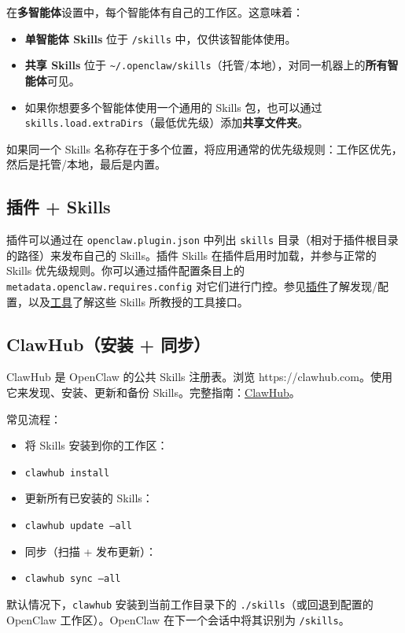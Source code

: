 在\textbf{多智能体}设置中，每个智能体有自己的工作区。这意味着：

\begin{itemize}
  \item \textbf{单智能体 Skills} 位于 \texttt{/skills} 中，仅供该智能体使用。
  \item \textbf{共享 Skills} 位于 \texttt{\textasciitilde{}/.openclaw/skills}（托管/本地），对同一机器上的\textbf{所有智能体}可见。
  \item 如果你想要多个智能体使用一个通用的 Skills 包，也可以通过 \texttt{skills.load.extraDirs}（最低优先级）添加\textbf{共享文件夹}。
\end{itemize}


如果同一个 Skills 名称存在于多个位置，将应用通常的优先级规则：工作区优先，然后是托管/本地，最后是内置。

\subsection{插件 + Skills}


插件可以通过在 \texttt{openclaw.plugin.json} 中列出 \texttt{skills} 目录（相对于插件根目录的路径）来发布自己的 Skills。插件 Skills 在插件启用时加载，并参与正常的 Skills 优先级规则。你可以通过插件配置条目上的 \texttt{metadata.openclaw.requires.config} 对它们进行门控。参见\href{/tools/plugin}{插件}了解发现/配置，以及\href{/tools}{工具}了解这些 Skills 所教授的工具接口。

\subsection{ClawHub（安装 + 同步）}


ClawHub 是 OpenClaw 的公共 Skills 注册表。浏览 https://clawhub.com。使用它来发现、安装、更新和备份 Skills。完整指南：\href{/tools/clawhub}{ClawHub}。

常见流程：

\begin{itemize}
  \item 将 Skills 安装到你的工作区：
  \item \texttt{clawhub install }
  \item 更新所有已安装的 Skills：
  \item \texttt{clawhub update --all}
  \item 同步（扫描 + 发布更新）：
  \item \texttt{clawhub sync --all}
\end{itemize}


默认情况下，\texttt{clawhub} 安装到当前工作目录下的 \texttt{./skills}（或回退到配置的 OpenClaw 工作区）。OpenClaw 在下一个会话中将其识别为 \texttt{/skills}。

